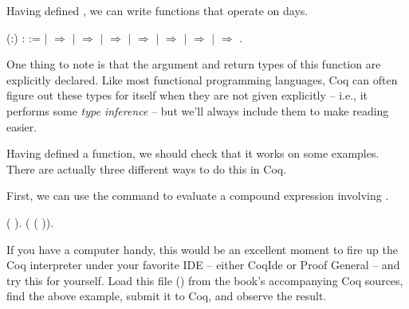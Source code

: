 \documentclass[12pt]{report}
\begin{document}
    Having defined , we can write functions that operate on
    days. \begin{coqdoccode}
\coqdocemptyline
\coqdocnoindent
{}  (:) :  :=\coqdoceol
\coqdocindent{1.00em}
  \coqdoceol
\coqdocindent{1.00em}
\ensuremath{|}     \ensuremath{\Rightarrow} \coqdoceol
\coqdocindent{1.00em}
\ensuremath{|}    \ensuremath{\Rightarrow} \coqdoceol
\coqdocindent{1.00em}
\ensuremath{|}  \ensuremath{\Rightarrow} \coqdoceol
\coqdocindent{1.00em}
\ensuremath{|}   \ensuremath{\Rightarrow} \coqdoceol
\coqdocindent{1.00em}
\ensuremath{|}     \ensuremath{\Rightarrow} \coqdoceol
\coqdocindent{1.00em}
\ensuremath{|}   \ensuremath{\Rightarrow} \coqdoceol
\coqdocindent{1.00em}
\ensuremath{|}     \ensuremath{\Rightarrow} \coqdoceol
\coqdocindent{1.00em}
.\coqdoceol
\coqdocemptyline
\end{coqdoccode}
One thing to note is that the argument and return types of
    this function are explicitly declared.  Like most functional
    programming languages, Coq can often figure out these types for
    itself when they are not given explicitly -- i.e., it performs
    some \textit{type inference} -- but we'll always include them to make
    reading easier. 

 Having defined a function, we should check that it works on
    some examples.  There are actually three different ways to do this
    in Coq.  


    First, we can use the command   to evaluate a
    compound expression involving .  \begin{coqdoccode}
\coqdocemptyline
\coqdocnoindent
{}   ( ).\coqdoceol
\coqdocnoindent
{}   ( ( )).\coqdoceol
\coqdocemptyline
\end{coqdoccode}
If you have a computer handy, this would be an excellent
    moment to fire up the Coq interpreter under your favorite IDE --
    either CoqIde or Proof General -- and try this for yourself.  Load
    this file () from the book's accompanying Coq sources,
    find the above example, submit it to Coq, and observe the
    result. 
\end{document}
